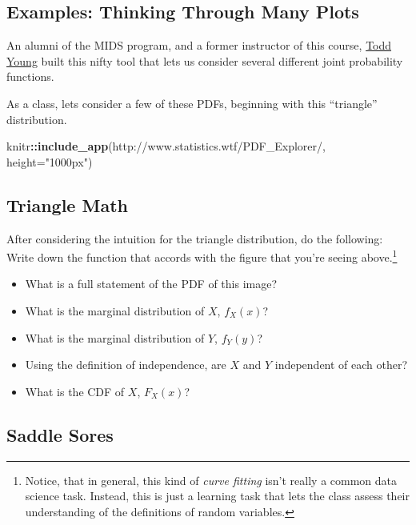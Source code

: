 \documentclass[
]{book}
\newenvironment{Shaded}{\begin{snugshade}}{\end{snugshade}}
\newcommand{\AttributeTok}[1]{\textcolor[rgb]{0.13,0.29,0.53}{#1}}
\newcommand{\FunctionTok}[1]{\textcolor[rgb]{0.13,0.29,0.53}{\textbf{#1}}}
\newcommand{\NormalTok}[1]{#1}
\newcommand{\SpecialCharTok}[1]{\textcolor[rgb]{0.81,0.36,0.00}{\textbf{#1}}}
\newcommand{\StringTok}[1]{\textcolor[rgb]{0.31,0.60,0.02}{#1}}
\providecommand{\tightlist}{%
  \setlength{\itemsep}{0pt}\setlength{\parskip}{0pt}}
\theoremstyle{definition}
\theoremstyle{definition}
\theoremstyle{definition}
\theoremstyle{definition}
\theoremstyle{remark}
\begin{document}
\subsection{Examples: Thinking Through Many Plots}\label{examples-thinking-through-many-plots}

An alumni of the MIDS program, and a former instructor of this course, \href{https://www.linkedin.com/in/dtoddyoung/}{Todd Young} built this nifty tool that lets us consider several different joint probability functions.

As a class, lets consider a few of these PDFs, beginning with this ``triangle'' distribution.

\begin{Shaded}
\begin{Highlighting}[]
\NormalTok{knitr}\SpecialCharTok{::}\FunctionTok{include\_app}\NormalTok{(}\StringTok{\textquotesingle{}http://www.statistics.wtf/PDF\_Explorer/\textquotesingle{}}\NormalTok{, }\AttributeTok{height=}\StringTok{"1000px"}\NormalTok{)}
\end{Highlighting}
\end{Shaded}

\subsection{Triangle Math}\label{triangle-math}

After considering the intuition for the triangle distribution, do the following: Write down the function that accords with the figure that you're seeing above.\footnote{Notice, that in general, this kind of \emph{curve fitting} isn't really a common data science task. Instead, this is just a learning task that lets the class assess their understanding of the definitions of random variables.}

\begin{itemize}
\tightlist
\item
  What is a full statement of the PDF of this image?
\item
  What is the marginal distribution of \(X\), \(f_{X}(x)\)?
\item
  What is the marginal distribution of \(Y\), \(f_{Y}(y)\)?
\item
  Using the definition of independence, are \(X\) and \(Y\) independent of each other?
\item
  What is the CDF of \(X\), \(F_{X}(x)\)?
\end{itemize}

\subsection{Saddle Sores}\label{saddle-sores}
\end{document}
